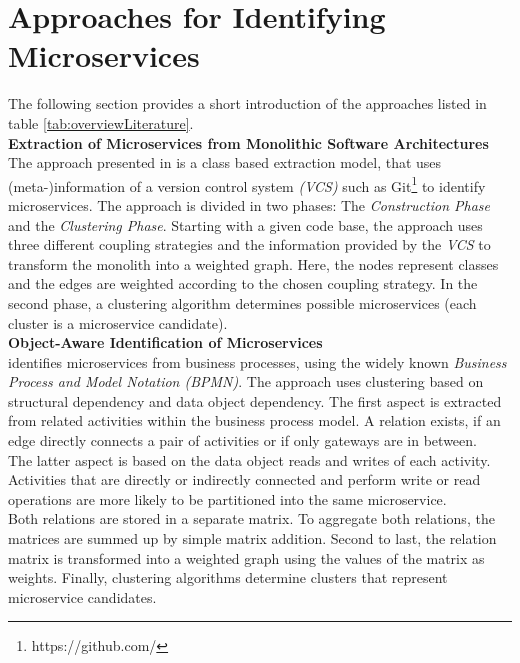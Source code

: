 \clearpage





\section{Approaches for Identifying Microservices}
\label{sec:stateOfTheArt:approaches}
The following section provides a short introduction of the approaches listed in table \ref{tab:overviewLiterature}. \\

\noindent
\textbf{Extraction of Microservices from Monolithic Software Architectures   } \\
The approach presented in \cite{ExtractionMazlami} is a class based extraction model, that uses (meta-)information of a version control system \textit{(VCS)} such as Git\footnote{https://github.com/} to identify microservices. The approach is divided in two phases: The \textit{Construction Phase} and the \textit{Clustering Phase}.
Starting with a given code base, the approach uses three different coupling strategies and the information provided by the \textit{VCS} to transform the monolith into a weighted graph. Here, the nodes represent classes and the edges are weighted according to the chosen coupling strategy. In the second phase, a clustering algorithm determines possible microservices (each cluster is a microservice candidate). \\

\noindent
\textbf{Object-Aware Identification of Microservices  } \\
\cite{ObjectAwareAmiri} identifies microservices from business processes, using the widely known \textit{Business Process and Model Notation (BPMN)}. The approach uses clustering based on structural dependency and data object dependency. The first aspect is extracted from related activities within the business process model. A relation exists, if an edge directly connects a pair of activities or if only gateways are in between. \\
The latter aspect is based on the data object reads and writes of each activity. Activities that are directly or indirectly connected and perform write or read operations are more likely to be partitioned into the same microservice. \\
Both relations are stored in a separate matrix. To aggregate both relations, the matrices are summed up by simple matrix addition. Second to last, the relation matrix is transformed into a weighted graph using the values of the matrix as weights. Finally, clustering algorithms determine clusters that represent microservice candidates.\\


